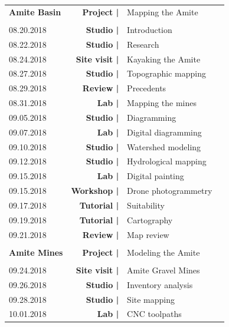 \documentclass[11pt,article,oneside]{memoir}
\begin{document}
\vspace*{-6em} %
\begin{table}[H]
\small
\begin{tabular}{l r @{\hskip 0.1cm} l @{\hskip 0.5cm} l} 
\\
\textbf{Amite Basin} & \textbf{Project |} & Mapping the Amite \\
\\
08.20.2018 & \textbf{Studio |} & Introduction \\
08.22.2018 & \textbf{Studio |} & Research \\
08.24.2018 & \textbf{Site visit |} & Kayaking the Amite \\
%
08.27.2018 & \textbf{Studio |} & Topographic mapping\\
08.29.2018 & \textbf{Review |} & Precedents \\
08.31.2018 & \textbf{Lab |} & Mapping the mines \\
%
09.05.2018 & \textbf{Studio |} & Diagramming \\
09.07.2018 & \textbf{Lab |} & Digital diagramming & \\
%
09.10.2018 & \textbf{Studio |} & Watershed modeling \\
09.12.2018 & \textbf{Studio |} & Hydrological mapping \\
09.15.2018 & \textbf{Lab |} & Digital painting \\
09.15.2018 & \textbf{Workshop |} & Drone photogrammetry \\
%
09.17.2018 & \textbf{Tutorial |} & Suitability \\
09.19.2018 & \textbf{Tutorial |} & Cartography \\
09.21.2018 & \textbf{Review |} & Map review \\
\\
\textbf{Amite Mines} & \textbf{Project |} & Modeling the Amite \\
\\
09.24.2018 & \textbf{Site visit |} & Amite Gravel Mines \\
09.26.2018 & \textbf{Studio |} & Inventory analysis \\
09.28.2018 & \textbf{Studio |} & Site mapping \\
%
10.01.2018 & \textbf{Lab |} & CNC toolpaths \\

\end{tabular}
\end{table}
\end{document}
